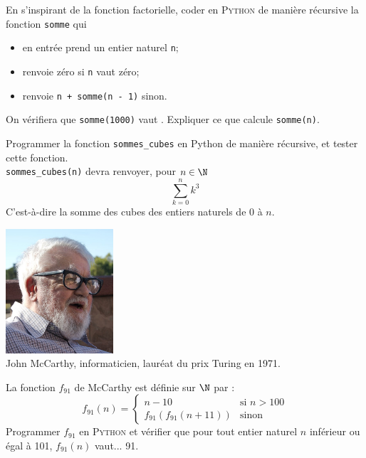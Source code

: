 \documentclass[10pt,firamath,cours]{nsi}
\begin{document}
\begin{exercice}[]
	En s'inspirant de la fonction factorielle, coder en \textsc{Python} de manière récursive la fonction \texttt{somme} qui
	\begin{itemize}
		\item 	en entrée prend un entier naturel \texttt{n};
		\item 	renvoie zéro si \texttt{n} vaut zéro;
		\item 	renvoie \texttt{n + somme(n - 1)} sinon.
	\end{itemize}
	On vérifiera que \texttt{somme(1000)} vaut . Expliquer ce que calcule \texttt{somme(n)}.
\end{exercice}

\begin{exercice}
	Programmer la fonction \texttt{sommes_cubes} en Python de manière récursive, et tester cette fonction.\\
	\texttt{sommes_cubes(n)} devra renvoyer, pour $n\in\N$ $$\sum_{k=0}^nk^3$$ C'est-à-dire la somme des cubes des entiers naturels de 0 à $n$.
\end{exercice}

\begin{exercice}
    \begin{center}
        \includegraphics[width=4cm]{img/mccarthy}\\\scriptsize
        John McCarthy, informaticien, lauréat du prix Turing en 1971.
    \end{center}
		La fonction $f_{91}$ de McCarthy est définie sur $\N$ par :
		$$f_{91}(n)=\begin{cases}
				n-10                            & \mbox{si } n>100 \\
				f_{91}\left(f_{91}(n+11)\right) & \mbox{sinon}
			\end{cases}$$
		Programmer $f_{91}$ en \textsc{Python} et vérifier que pour tout entier naturel $n$ inférieur ou égal à 101, $f_{91}(n)$ vaut... 91.


\end{exercice}
\end{document}
